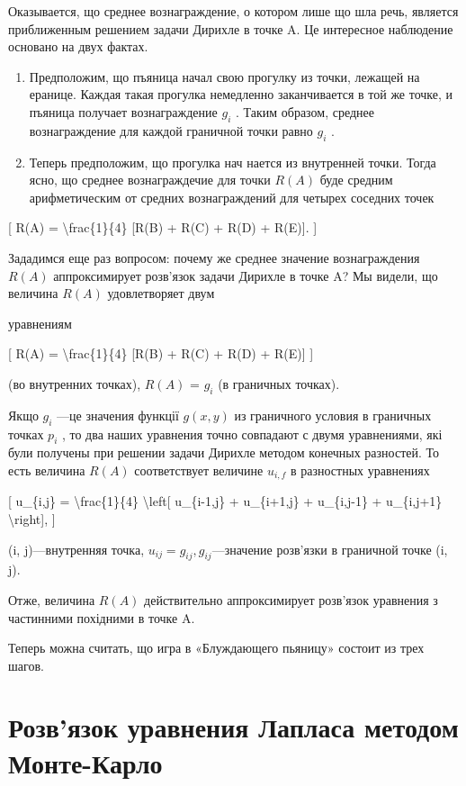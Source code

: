 \documentclass[
]{article}
\begin{document}
Оказывается, що среднее вознаграждение, о котором лише що шла речь,
является приближенным решением задачи Дирихле в точке A. Це интересное
наблюдение основано на двух фактах.

\begin{enumerate}
\def\labelenumi{\arabic{enumi}.}
\item
  Предположим, що пъяница начал свою прогулку из точки, лежащей на
  еранице. Каждая такая прогулка немедленно заканчивается в той же
  точке, и пъяница получает вознаграждение \(g_i\) . Таким образом,
  среднее вознаграждение для каждой граничной точки равно \(g_i\) .
\item
  Теперь предположим, що прогулка нач нается из внутренней точки. Тогда
  ясно, що среднее вознаграждечие для точки \(R(A)\) буде средним
  арифметическим от средних вознаграждений для четырех соседних точек
\end{enumerate}

{[} R(A) = \textbackslash frac\{1\}\{4\} {[}R(B) + R(C) + R(D) +
R(E){]}. {]}

Зададимся еще раз вопросом: почему же среднее значение вознаграждения
\(R(A)\) аппроксимирует розв'язок задачи Дирихле в точке A? Мы видели,
що величина \(R(A)\) удовлетворяет двум

уравнениям

{[} R(A) = \textbackslash frac\{1\}\{4\} {[}R(B) + R(C) + R(D) + R(E){]}
{]}

(во внутренних точках), \(R(A)\) = \(g_i\) (в граничных точках).

Якщо \(g_i\) ---це значения функції \(g(x, y)\) из граничного условия в
граничных точках \(p_i\) , то два наших уравнения точно совпадают с
двумя уравнениями, які були получены при решении задачи Дирихле методом
конечных разностей. То есть величина \(R(A)\) соответствует величине
\(u_{i,f}\) в разностных уравнениях

{[} u\_\{i,j\} = \textbackslash frac\{1\}\{4\} \textbackslash left{[}
u\_\{i-1,j\} + u\_\{i+1,j\} + u\_\{i,j-1\} + u\_\{i,j+1\}
\textbackslash right{]}, {]}

(i, j)---внутренняя точка, \(u_{ij} = g_{ij}, g_{ij}\)---значение
розв'язки в граничной точке (i, j).

Отже, величина \(R(A)\) действительно аппроксимирует розв'язок уравнения
з частинними похідними в точке A.

Теперь можна считать, що игра в «Блуждающего пьяницу» состоит из трех
шагов.

\section{Розв'язок уравнения Лапласа методом
Монте-Карло}\label{ux440ux43eux437ux432ux44fux437ux43eux43a-ux443ux440ux430ux432ux43dux435ux43dux438ux44f-ux43bux430ux43fux43bux430ux441ux430-ux43cux435ux442ux43eux434ux43eux43c-ux43cux43eux43dux442ux435-ux43aux430ux440ux43bux43e}
\end{document}
